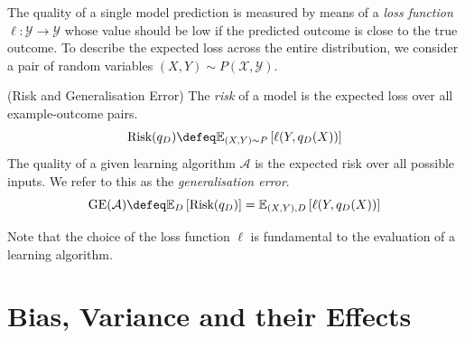 \documentclass[
    a4paper, %
	fontsize=10pt, %
	twoside=false, %
]{kaobook}
\begin{document}
\begin{titlepage}

%
The quality of a single model prediction is measured by means of a \textit{loss function} $\ell: \mathcal{Y} \to \mathcal{Y}$ whose value should be low if the predicted outcome is close to the true outcome. 
To describe the expected loss across the entire distribution, we consider a pair of random variables $(X,Y) \sim P(\mathcal{X}, \mathcal{Y})$. 

\begin{definition} (Risk and Generalisation Error)
The \textit{risk} of a model is the expected loss over all example-outcome pairs.
$$
\text{Risk}(q_{D}) \defeq \mathbb{E}_{(X,Y)\sim P}\left[ \ell(Y, q_{D}(X)) \right] 
$$
%
The quality of a given learning algorithm $\mathcal{A}$ is the expected risk over all possible inputs. We refer to this as the \textit{generalisation error}. 
$$
\text{GE}(\mathcal{A}) \defeq \mathbb{E}_{D}\left[ \text{Risk}(q_{D}) \right]  = \mathbb{E}_{(X,Y), D}\left[ \ell(Y, q_{D}(X)) \right] 
$$
\end{definition}
Note that the choice of the loss function $\ell$ is fundamental to the evaluation of a learning algorithm.

\section{Bias, Variance and their Effects}
 \label{sec:bias-variance-effects}


\end{titlepage}
\end{document}

